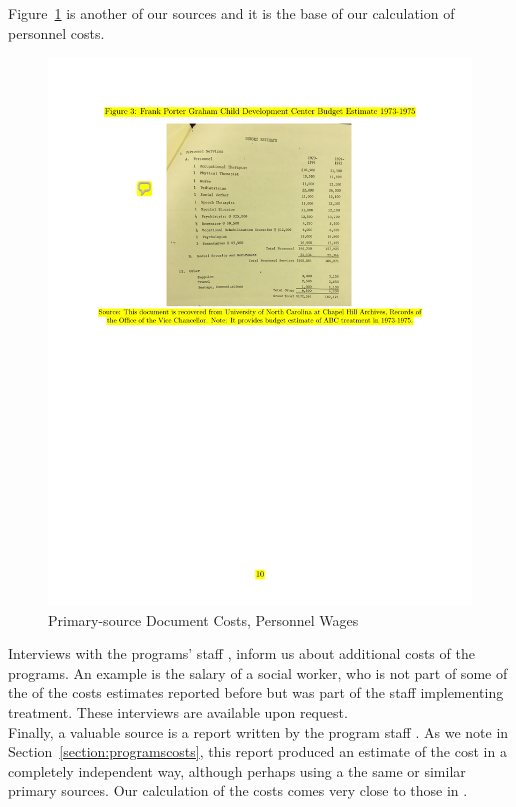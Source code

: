 \noindent Figure~\ref{figure:wages} is another of our sources and it is the base of our calculation of personnel costs.

\begin{center}
\begin{figure}[H] 
\caption{Primary-source Document Costs, Personnel Wages}
\label{figure:wages}
\centering
\includegraphics[width=.9\columnwidth]{AppOutput/Program/UNC-costs_budget.pdf}
\end{figure}
\end{center}



\noindent Interviews with the programs' staff \citet{projectcare2014interviews,abc2014-2015interviews}, inform us about additional costs of the programs. An example is the salary of a social worker, who is not part of some of the of the costs estimates reported before but was part of the staff implementing treatment. These interviews are available upon request.\\ 

\noindent Finally, a valuable source is a report written by the program staff \citet{FPG_1979_Progress-Report}. As we note in Section~\ref{section:programscosts}, this report produced an estimate of the cost in a completely independent way, although perhaps using a the same or similar primary sources. Our calculation of the costs comes very close to those in \citet{FPG_1979_Progress-Report}. 